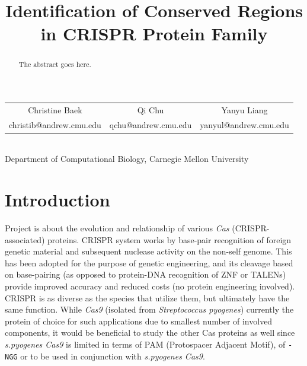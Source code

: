 \documentclass[11pt, oneside]{article}
\begin{document}
\title{\textbf{Identification of Conserved Regions\\ in CRISPR Protein Family}\\ }

\maketitle

\begin{center}
\begin{tabular}{ c c c }
 Christine Baek & Qi Chu & Yanyu Liang \\ 
christib@andrew.cmu.edu & qchu@andrew.cmu.edu & yanyul@andrew.cmu.edu \\     
\end{tabular}\\
\smallskip
\smallskip
Department of Computational Biology, Carnegie Mellon University
\end{center}

\bigskip

\begin{abstract}
The abstract goes here.
\end{abstract}



\section{Introduction}
Project is about the evolution and relationship of various \textit{Cas} (CRISPR-associated) proteins. CRISPR system works by base-pair recognition of foreign genetic material and subsequent nuclease activity on the non-self genome. This has been adopted for the purpose of genetic engineering, and its cleavage based on base-pairing (as opposed to protein-DNA recognition of ZNF or TALENs) provide improved accuracy and reduced costs (no protein engineering involved). CRISPR is as diverse as the species that utilize them, but ultimately have the same function. While \textit{Cas9} (isolated from \textit{Streptococcus pyogenes}) currently the protein of choice for such applications due to smallest number of involved components, it would be beneficial to study the other Cas proteins as well since \textit{s.pyogenes Cas9} is limited in terms of PAM (Protospacer Adjacent Motif), of \texttt{-NGG} or to be used in conjunction with \textit{s.pyogenes Cas9}.
\end{document}
